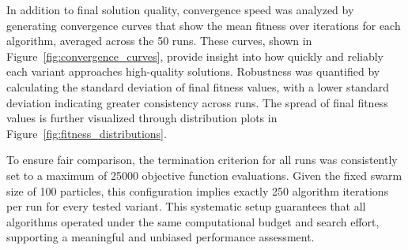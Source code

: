 {In addition to final solution quality, convergence speed was analyzed by generating convergence curves that show the mean fitness over iterations for each algorithm, averaged across the 50 runs. These curves, shown in Figure~\ref{fig:convergence_curves}, provide insight into how quickly and reliably each variant approaches high-quality solutions. Robustness was quantified by calculating the standard deviation of final fitness values, with a lower standard deviation indicating greater consistency across runs. The spread of final fitness values is further visualized through distribution plots in Figure~\ref{fig:fitness_distributions}.

To ensure fair comparison, the termination criterion for all runs was consistently set to a maximum of 25000 objective function evaluations. Given the fixed swarm size of 100 particles, this configuration implies exactly 250 algorithm iterations per run for every tested variant. This systematic setup guarantees that all algorithms operated under the same computational budget and search effort, supporting a meaningful and unbiased performance assessment.











}
